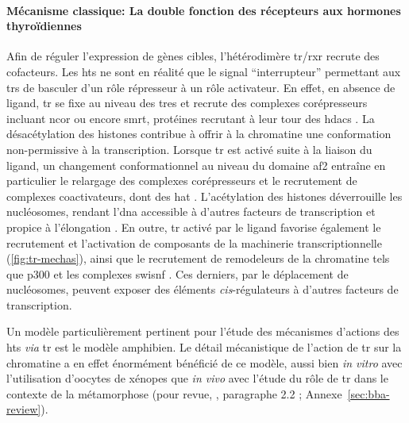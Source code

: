 \documentclass[../main.tex]{subfiles}
\begin{document}
\paragraph{Mécanisme classique: La double fonction des récepteurs aux hormones thyroïdiennes}
Afin de réguler l'expression de gènes cibles, l'hétérodimère \gls{tr}/\gls{rxr} recrute des cofacteurs.
Les \glspl{ht} ne sont en réalité que le signal ``interrupteur'' permettant aux \glspl{tr} de basculer d'un rôle répresseur à un rôle activateur.
En effet, en absence de ligand, \gls{tr} se fixe au niveau des \glspl{tre} et recrute des complexes corépresseurs incluant \gls{ncor} ou encore \gls{smrt}, protéines recrutant à leur tour des \glspl{hdac} \citep{Wong1998}.
La désacétylation des histones contribue à offrir à la chromatine une conformation non-permissive à la transcription.
Lorsque \gls{tr} est activé suite à la liaison du ligand, un changement conformationnel au niveau du domaine \gls{af2} entraîne en particulier le relargage des complexes corépresseurs et le recrutement de complexes coactivateurs, dont des \gls{hat} \citep{Wolffe1997}.
L'acétylation des histones déverrouille les nucléosomes, rendant l'\gls{dna} accessible à d'autres facteurs de transcription et propice à l'élongation \citep{Wong1997}.
En outre, \gls{tr} activé par le ligand favorise également le recrutement et l'activation de composants de la machinerie transcriptionnelle (\autoref{fig:tr-mechas}), ainsi que le recrutement de remodeleurs de la chromatine tels que p300 et les complexes \gls{swisnf} \citep{Huang2003,Heimeier2008}.
Ces derniers, par le déplacement de nucléosomes, peuvent exposer des éléments \textit{cis}-régulateurs à d'autres facteurs de transcription.
\par
Un modèle particulièrement pertinent pour l'étude des mécanismes d'actions des \glspl{ht} \textit{via} \gls{tr} est le modèle amphibien.
Le détail mécanistique de l'action de \gls{tr} sur la chromatine a en effet énormément bénéficié de ce modèle, aussi bien \textit{in vitro} avec l'utilisation d'oocytes de xénopes que \textit{in vivo} avec l'étude du rôle de \gls{tr} dans le contexte de la métamorphose (pour revue, \citealp{Grimaldi2012}, paragraphe 2.2 ; Annexe~\ref{sec:bba-review}).
\end{document}
